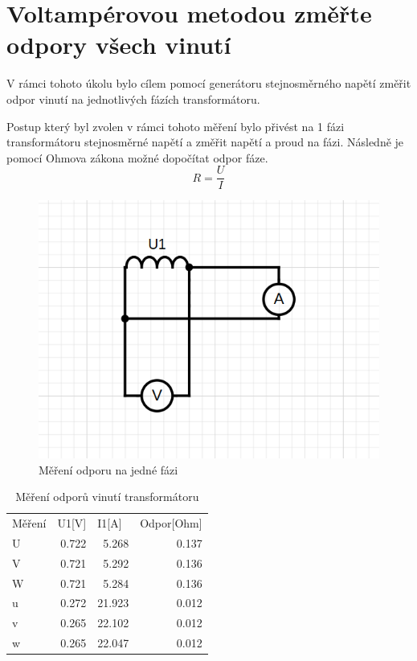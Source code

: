 \documentclass{protokol}
\begin{document}
\section{Voltampérovou metodou změřte odpory všech vinutí}
V rámci tohoto úkolu bylo cílem pomocí generátoru stejnosměrného napětí změřit odpor vinutí na jednotlivých fázích transformátoru. 

Postup který byl zvolen v rámci tohoto měření bylo přivést na 1 fázi transformátoru stejnosměrné napětí a změřit napětí a proud na fázi. Následně je pomocí Ohmova zákona možné dopočítat odpor fáze.
\begin{equation}
    R = \frac{U}{I}    
    \label{eq:ohmuvZakon}
\end{equation}

\begin{figure}[H]
    \centering
    \includegraphics[width=0.5\linewidth]{MereniOdporu.png}
    \caption{Měření odporu na jedné fázi}
    \label{fig:enter-label}
\end{figure}

\begin{table}[H]
\centering
\caption{Měření odporů vinutí transformátoru}
\begin{tabular}{lrrr}
\rowcolor[HTML]{F8F9FA} 
Měření & \multicolumn{1}{l}{\cellcolor[HTML]{F8F9FA}U1{[}V{]}} & \multicolumn{1}{l}{\cellcolor[HTML]{F8F9FA}I1{[}A{]}} & \multicolumn{1}{l}{\cellcolor[HTML]{F8F9FA}Odpor{[}Ohm{]}} \\
\cellcolor[HTML]{FFFFFF}U & \cellcolor[HTML]{FFFFFF}0.722 & 5.268 & 0.137 \\
V & 0.721 & 5.292 & 0.136 \\
W & 0.721 & 5.284 & 0.136 \\
u & 0.272 & 21.923 & 0.012 \\
v & 0.265 & 22.102 & 0.012 \\
w & 0.265 & 22.047 & 0.012
\end{tabular}
\label{tab:MereniOdporuVinuti}
\end{table}
\end{document}

